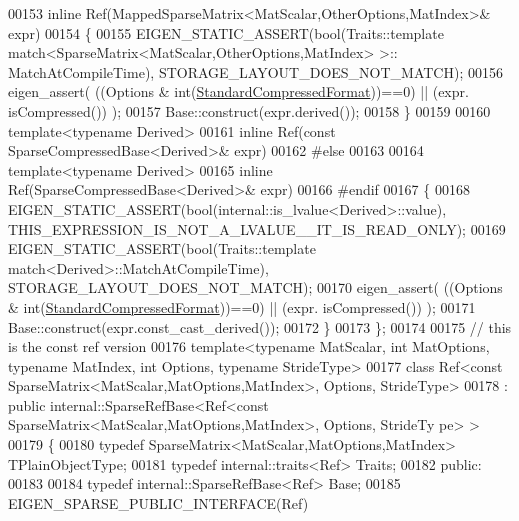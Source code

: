 \begin{DoxyCode}
00153     \textcolor{keyword}{inline} Ref(MappedSparseMatrix<MatScalar,OtherOptions,MatIndex>& expr)
00154     \{
00155       EIGEN\_STATIC\_ASSERT(\textcolor{keywordtype}{bool}(Traits::template match<SparseMatrix<MatScalar,OtherOptions,MatIndex> >::
      MatchAtCompileTime), STORAGE\_LAYOUT\_DOES\_NOT\_MATCH);
00156       eigen\_assert( ((Options & \textcolor{keywordtype}{int}(\hyperlink{namespace_eigen_a668ffb0fb66c55c1c98bd35c52df648eaf81fc519ed9cc0ebc6aac69a366086a5}{StandardCompressedFormat}))==0) || (expr.
      isCompressed()) );
00157       Base::construct(expr.derived());
00158     \}
00159     
00160     \textcolor{keyword}{template}<\textcolor{keyword}{typename} Derived>
00161     \textcolor{keyword}{inline} Ref(\textcolor{keyword}{const} SparseCompressedBase<Derived>& expr)
00162     \textcolor{preprocessor}{#else}
00163 
00164     \textcolor{keyword}{template}<\textcolor{keyword}{typename} Derived>
00165     \textcolor{keyword}{inline} Ref(SparseCompressedBase<Derived>& expr)
00166     \textcolor{preprocessor}{#endif}
00167     \{
00168       EIGEN\_STATIC\_ASSERT(\textcolor{keywordtype}{bool}(internal::is\_lvalue<Derived>::value), 
      THIS\_EXPRESSION\_IS\_NOT\_A\_LVALUE\_\_IT\_IS\_READ\_ONLY);
00169       EIGEN\_STATIC\_ASSERT(\textcolor{keywordtype}{bool}(Traits::template match<Derived>::MatchAtCompileTime), 
      STORAGE\_LAYOUT\_DOES\_NOT\_MATCH);
00170       eigen\_assert( ((Options & \textcolor{keywordtype}{int}(\hyperlink{namespace_eigen_a668ffb0fb66c55c1c98bd35c52df648eaf81fc519ed9cc0ebc6aac69a366086a5}{StandardCompressedFormat}))==0) || (expr.
      isCompressed()) );
00171       Base::construct(expr.const\_cast\_derived());
00172     \}
00173 \};
00174 
00175 \textcolor{comment}{// this is the const ref version}
00176 \textcolor{keyword}{template}<\textcolor{keyword}{typename} MatScalar, \textcolor{keywordtype}{int} MatOptions, \textcolor{keyword}{typename} MatIndex, \textcolor{keywordtype}{int} Options, \textcolor{keyword}{typename} Str\textcolor{keywordtype}{id}eType>
00177 \textcolor{keyword}{class }Ref<const SparseMatrix<MatScalar,MatOptions,MatIndex>, Options, StrideType>
00178   : \textcolor{keyword}{public} internal::SparseRefBase<Ref<const SparseMatrix<MatScalar,MatOptions,MatIndex>, Options, StrideTy
      pe> >
00179 \{
00180     \textcolor{keyword}{typedef} SparseMatrix<MatScalar,MatOptions,MatIndex> TPlainObjectType;
00181     \textcolor{keyword}{typedef} internal::traits<Ref> Traits;
00182   \textcolor{keyword}{public}:
00183 
00184     \textcolor{keyword}{typedef} internal::SparseRefBase<Ref> Base;
00185     EIGEN\_SPARSE\_PUBLIC\_INTERFACE(Ref)

\end{DoxyCode}
